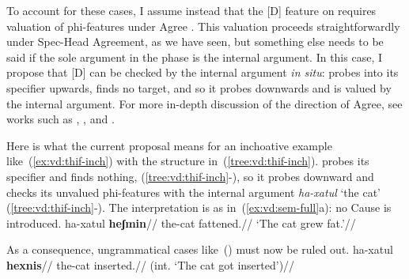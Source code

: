 To account for these cases, I assume instead that the [D] feature on {\vd} requires valuation of phi-features under Agree \citep{nie17,schaefer17oup}. This valuation proceeds straightforwardly under Spec-Head Agreement, as we have seen, but something else needs to be said if the sole argument in the phase is the internal argument. In this case, I propose that [D] can be checked by the internal argument \emph{in situ}: {\vd} probes into its specifier upwards, finds no target, and so it probes downwards and is valued by the internal argument. For more in-depth discussion of the direction of Agree, see works such as \cite{bejarrezac09}, \cite{zeijlstra12}, \cite{preminger13tlr} and \cite{deal15nels}.

Here is what the current proposal means for an inchoative example like~(\ref{ex:vd:thif-inch}) with the structure in~(\ref{tree:vd:thif-inch}). {\vd} probes its specifier and finds nothing, (\ref{tree:vd:thif-inch}-), so it probes downward and checks its unvalued phi-features with the internal argument \emph{ha-xatul} `the cat' (\ref{tree:vd:thif-inch}-). The interpretation is as in~(\ref{ex:vd:sem-full}a): no Cause is introduced.
\ex\label{ex:vd:thif-inch} \begingl
	\gla ha-xatul \textbf{heʃmin}//
	\glb the-cat fattened.//
	\glft `The cat grew fat.'//
	\endgl
\xe
	
	\ex\label{tree:vd:thif-inch}
	\xe
\bigskip

As a consequence, ungrammatical cases like~(\nextx) must now be ruled out.
\pex\label{ex:counterex}
	\a \ljudge{*}
		\begingl
		\gla ha-xatul \textbf{hexnis}//
		\glb the-cat inserted.//
		\glft (int. `The cat got inserted')//
	\endgl
	
